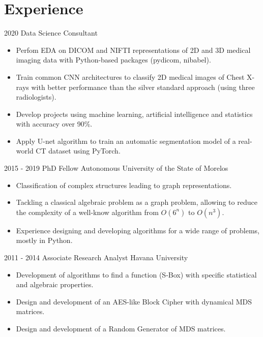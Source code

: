 \documentclass[]{friggeri-cv}
\begin{document}
\section{Experience}
\begin{entrylist}
    \entry
    {2020}
    {Data Science Consultant}
    {}
    {\vspace{-.1in}
\begin{itemize}
\item  Perfom EDA on  DICOM and NIFTI representations of 2D and 3D medical imaging data with  Python-based  packages (pydicom, nibabel).
\item Train common CNN architectures to classify 2D medical images of Chest X-rays with better performance than the silver standard approach (using three radiologists).
\item   Develop  projects using machine learning, artificial intelligence and statistics with  accuracy over  90\%.
\item  Apply U-net algorithm to train an automatic segmentation
 model of a real-world CT dataset using PyTorch.
\end{itemize}    
   }
    \entry
    {2015 - 2019}
    {PhD Fellow}
    {Autonomous University of the State of Morelos}
    {\vspace{-.1in}
\begin{itemize}
  \item Classification of complex structures leading to graph representations.
\item Tackling a classical algebraic problem as a graph problem, allowing to reduce the complexity of a well-know algorithm from $O(6^n)$ to $O(n^3)$. 
\item  Experience designing and developing algorithms for a wide range of problems, mostly in Python.  
\end{itemize}    
   }
  \entry
    {2011 - 2014}
    { Associate Research Analyst}
    {Havana University}
    { \vspace{-.1in}
    \begin{itemize}
    \item  Development of algorithms  to find a function (S-Box) with specific statistical and algebraic properties.
    \item Design and development of an AES-like  Block Cipher with dynamical MDS matrices.
    \item Design and development of a Random Generator of MDS matrices.
    \end{itemize}
 } 
\end{entrylist}\vspace*{-0.1in}
\end{document}
